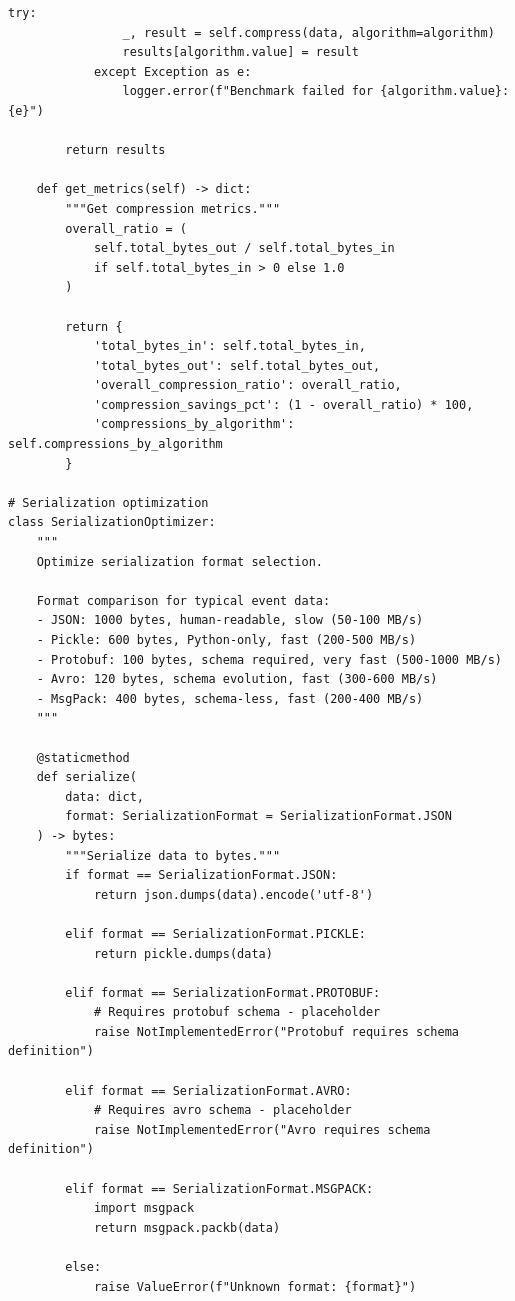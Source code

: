 \begin{lstlisting}[style=python, caption={Compression Optimizer for Data Types}]
            try:
                _, result = self.compress(data, algorithm=algorithm)
                results[algorithm.value] = result
            except Exception as e:
                logger.error(f"Benchmark failed for {algorithm.value}: {e}")

        return results

    def get_metrics(self) -> dict:
        """Get compression metrics."""
        overall_ratio = (
            self.total_bytes_out / self.total_bytes_in
            if self.total_bytes_in > 0 else 1.0
        )

        return {
            'total_bytes_in': self.total_bytes_in,
            'total_bytes_out': self.total_bytes_out,
            'overall_compression_ratio': overall_ratio,
            'compression_savings_pct': (1 - overall_ratio) * 100,
            'compressions_by_algorithm': self.compressions_by_algorithm
        }

# Serialization optimization
class SerializationOptimizer:
    """
    Optimize serialization format selection.

    Format comparison for typical event data:
    - JSON: 1000 bytes, human-readable, slow (50-100 MB/s)
    - Pickle: 600 bytes, Python-only, fast (200-500 MB/s)
    - Protobuf: 100 bytes, schema required, very fast (500-1000 MB/s)
    - Avro: 120 bytes, schema evolution, fast (300-600 MB/s)
    - MsgPack: 400 bytes, schema-less, fast (200-400 MB/s)
    """

    @staticmethod
    def serialize(
        data: dict,
        format: SerializationFormat = SerializationFormat.JSON
    ) -> bytes:
        """Serialize data to bytes."""
        if format == SerializationFormat.JSON:
            return json.dumps(data).encode('utf-8')

        elif format == SerializationFormat.PICKLE:
            return pickle.dumps(data)

        elif format == SerializationFormat.PROTOBUF:
            # Requires protobuf schema - placeholder
            raise NotImplementedError("Protobuf requires schema definition")

        elif format == SerializationFormat.AVRO:
            # Requires avro schema - placeholder
            raise NotImplementedError("Avro requires schema definition")

        elif format == SerializationFormat.MSGPACK:
            import msgpack
            return msgpack.packb(data)

        else:
            raise ValueError(f"Unknown format: {format}")


\end{lstlisting}
